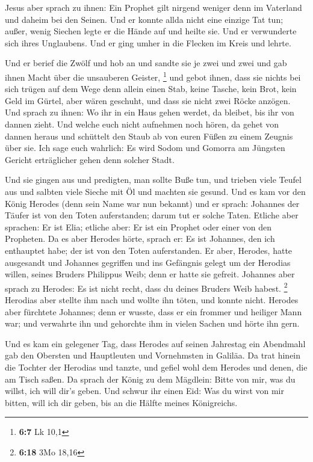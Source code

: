  Jesus aber sprach zu ihnen: Ein Prophet gilt nirgend
weniger denn im Vaterland und daheim bei den Seinen.  Und er
konnte allda nicht eine einzige Tat tun; außer, wenig Siechen legte er
die Hände auf und heilte sie.  Und er verwunderte sich ihres
Unglaubens. Und er ging umher in die Flecken im Kreis und lehrte.

 Und er berief die Zwölf und hob an und sandte sie je zwei
und zwei und gab ihnen Macht über die unsauberen Geister, \footnote{\textbf{6:7}
  Lk 10,1}  und gebot ihnen, dass sie nichts bei sich trügen
auf dem Wege denn allein einen Stab, keine Tasche, kein Brot, kein Geld
im Gürtel,  aber wären geschuht, und dass sie nicht zwei
Röcke anzögen.  Und sprach zu ihnen: Wo ihr in ein Haus
gehen werdet, da bleibet, bis ihr von dannen zieht.  Und
welche euch nicht aufnehmen noch hören, da gehet von dannen heraus und
schüttelt den Staub ab von euren Füßen zu einem Zeugnis über sie. Ich
sage euch wahrlich: Es wird Sodom und Gomorra am Jüngsten Gericht
erträglicher gehen denn solcher Stadt.

 Und sie gingen aus und predigten, man sollte Buße tun,
 und trieben viele Teufel aus und salbten viele Sieche mit
Öl und machten sie gesund.  Und es kam vor den König
Herodes (denn sein Name war nun bekannt) und er sprach: Johannes der
Täufer ist von den Toten auferstanden; darum tut er solche Taten.
 Etliche aber sprachen: Er ist Elia; etliche aber: Er ist
ein Prophet oder einer von den Propheten.  Da es aber
Herodes hörte, sprach er: Es ist Johannes, den ich enthauptet habe; der
ist von den Toten auferstanden.  Er aber, Herodes, hatte
ausgesandt und Johannes gegriffen und ins Gefängnis gelegt um der
Herodias willen, seines Bruders Philippus Weib; denn er hatte sie
gefreit.  Johannes aber sprach zu Herodes: Es ist nicht
recht, dass du deines Bruders Weib habest. \footnote{\textbf{6:18} 3Mo
  18,16}  Herodias aber stellte ihm nach und wollte ihn
töten, und konnte nicht.  Herodes aber fürchtete Johannes;
denn er wusste, dass er ein frommer und heiliger Mann war; und verwahrte
ihn und gehorchte ihm in vielen Sachen und hörte ihn gern.

 Und es kam ein gelegener Tag, dass Herodes auf seinen
Jahrestag ein Abendmahl gab den Obersten und Hauptleuten und Vornehmsten
in Galiläa.  Da trat hinein die Tochter der Herodias und
tanzte, und gefiel wohl dem Herodes und denen, die am Tisch saßen. Da
sprach der König zu dem Mägdlein: Bitte von mir, was du willst, ich will
dir's geben.  Und schwur ihr einen Eid: Was du wirst von
mir bitten, will ich dir geben, bis an die Hälfte meines Königreichs.

